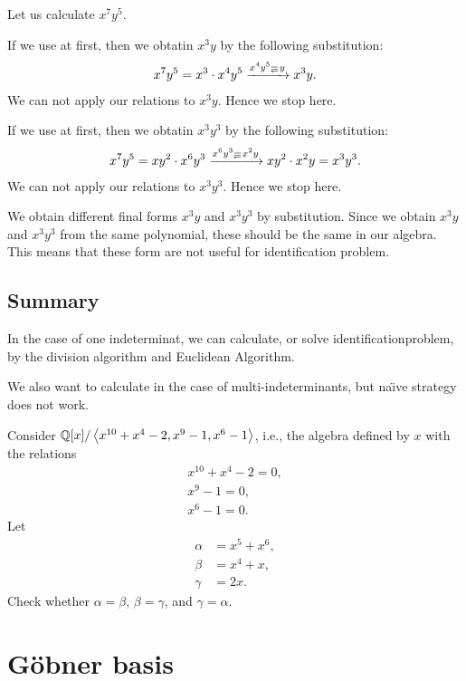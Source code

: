 Let us calculate $x^7y^5$.

If we use  at first,
then we obtatin $x^3y$
by the following substitution:
\begin{align*}
  x^7y^5=x^3\cdot x^4y^5
  \xrightarrow{x^4y^5\Denotes y}
  x^3y.
\end{align*}
We can not apply our relations to $x^3y$.
Hence we stop here.

If we use  at first,
then we obtatin $x^3y^3$
by the following substitution:
\begin{align*}
  x^7y^5=xy^2\cdot x^6y^3
  \xrightarrow{x^6y^3\Denotes x^2y}
  xy^2\cdot x^2y=x^3y^3 .
\end{align*}
We can not apply our relations to $x^3y^3$.
Hence we stop here.

We obtain different final forms $x^3y$ and $x^3y^3$ by substitution.
Since  we obtain $x^3y$ and $x^3y^3$ from the same polynomial,
these should be the same in our algebra.
This means that these form are not useful for identification problem.

\section{Summary}
In the case of one indeterminat,
we can calculate, or solve identificationproblem,
by the division algorithm and Euclidean Algorithm.

We also want to calculate in the case of multi-indeterminants,
but na\"\i ve
strategy does not work.

\begin{quiz}
  Consider $\mathbb{Q}[x]/\Braket{x^{10}+x^4-2,x^9-1,x^6-1}$,
  i.e.,
  the algebra defined by $x$ with the relations
  \begin{align*}
    x^{10}+x^4-2=0,\\x^9-1=0,\\x^6-1=0.
  \end{align*}
  Let
  \begin{align*}
    \alpha &= x^5 + x^6,\\
    \beta &= x^4 + x,\\
    \gamma &= 2x.
  \end{align*}
  Check whether $\alpha=\beta$, $\beta=\gamma$,
  and $\gamma=\alpha$.
\end{quiz}


\chapter{G\"obner basis}
\label{chap:defgb}
